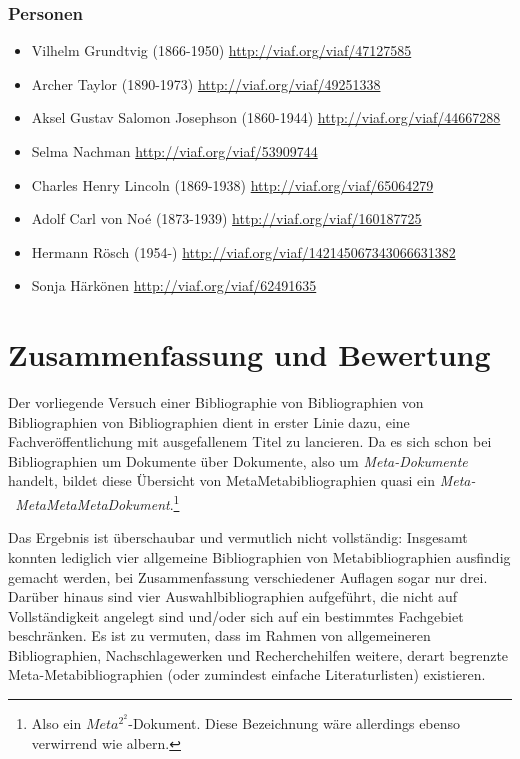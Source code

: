 \documentclass[a4paper,
fontsize=11pt,
oneside,
numbers=noperiodatend,
parskip=half-,
bibliography=totoc,
final
]{scrartcl}
\providecommand{\tightlist}{%
  \setlength{\itemsep}{0pt}\setlength{\parskip}{0pt}}
\begin{document}
\subsubsection*{Personen}\label{personen}

\begin{itemize}
\tightlist
\item
  Vilhelm Grundtvig (1866-1950) \url{http://viaf.org/viaf/47127585}
\item
  Archer Taylor (1890-1973) \url{http://viaf.org/viaf/49251338}
\item
  Aksel Gustav Salomon Josephson (1860-1944)
  \url{http://viaf.org/viaf/44667288}
\item
  Selma Nachman \url{http://viaf.org/viaf/53909744}
\item
  Charles Henry Lincoln (1869-1938) \url{http://viaf.org/viaf/65064279}
\item
  Adolf Carl von Noé (1873-1939) \url{http://viaf.org/viaf/160187725}
\item
  Hermann Rösch (1954-) \url{http://viaf.org/viaf/142145067343066631382}
\item
  Sonja Härkönen \url{http://viaf.org/viaf/62491635}
\end{itemize}

\section*{Zusammenfassung und
Bewertung}\label{zusammenfassung-und-bewertung}

Der vorliegende Versuch einer Bibliographie von Bibliographien von
Bibliographien von Bibliographien dient in erster Linie dazu, eine
Fachveröffentlichung mit ausgefallenem Titel zu lancieren. Da es sich
schon bei Bibliographien um Dokumente über Dokumente, also um
\emph{Meta-Dokumente} handelt, bildet diese Übersicht von
Meta\-Metabibliographien quasi ein \emph{Meta-\
Meta\-Meta\-Meta\-Dokument}.\footnote{Also ein \(Meta^{2^2}\)-Dokument.
  Diese Bezeichnung wäre allerdings ebenso verwirrend wie albern.}

Das Ergebnis ist überschaubar und vermutlich nicht vollständig:
Insgesamt konnten lediglich vier allgemeine Bibliographien von
Metabibliographien ausfindig gemacht werden, bei Zusammenfassung
verschiedener Auflagen sogar nur drei. Darüber hinaus sind vier
Auswahlbibliographien aufgeführt, die nicht auf Vollständigkeit angelegt
sind und/oder sich auf ein bestimmtes Fachgebiet beschränken. Es ist zu
vermuten, dass im Rahmen von allgemeineren Bibliographien,
Nachschlagewerken und Recherchehilfen weitere, derart begrenzte
Meta-Meta\-biblio\-graphien (oder zumindest einfache Literaturlisten)
existieren.
\end{document}

